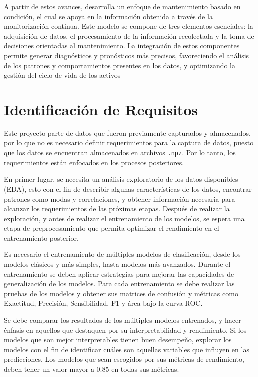 \documentclass[11pt,a4paper,spanish]{book}
\numberwithin{equation}{chapter}
\numberwithin{figure}{chapter}
\begin{document}
A partir de estos avances, \cite{jardine2006review} desarrolla un enfoque de 
mantenimiento basado en condición, el cual se apoya en la información obtenida a 
través de la monitorización continua. Este modelo se compone de tres elementos 
esenciales: la adquisición de datos, el procesamiento de la información recolectada y 
la toma de decisiones orientadas al mantenimiento. La integración de estos componentes 
permite generar diagnósticos y pronósticos más precisos, favoreciendo el análisis de 
los patrones y comportamientos presentes en los datos, y optimizando la gestión del 
ciclo de vida de los activos \cite{jardine2006review}


\chapter{Identificación de Requisitos}


Este proyecto parte de datos que fueron previamente capturados y almacenados, por lo 
que no es necesario definir requerimientos para la captura de datos, puesto que los 
datos se encuentran almacenados en archivos \texttt{.npz}. 
Por lo tanto, los requerimientos están enfocados en los procesos posteriores. 


En primer lugar,  se necesita un análisis exploratorio de los datos disponibles (EDA), 
esto con el fin de describir algunas características de los datos, encontrar patrones 
como modas y correlaciones, y obtener información necesaria para alcanzar los 
requerimientos de las próximas etapas.  Después de realizar la exploración, y antes de 
realizar el entrenamiento de los modelos, se espera una etapa de preprocesamiento que 
permita optimizar el rendimiento en el entrenamiento posterior.


Es necesario el entrenamiento de múltiples modelos de clasificación, desde los modelos 
clásicos y más simples, hasta modelos más avanzados. Durante el entrenamiento se deben 
aplicar estrategias para mejorar las capacidades de generalización de los modelos. 
Para cada entrenamiento se debe realizar las pruebas de los modelos y obtener sus 
matrices de confusión y métricas como  Exactitud, Precisión, Sensibilidad, F1 y 
área bajo la curva ROC.


Se debe comparar los resultados de los múltiples modelos entrenados, y hacer énfasis en 
aquellos que destaquen por su interpretabilidad y rendimiento. Si los modelos que son 
mejor interpretables tienen buen desempeño, explorar los modelos con el fin de 
identificar cuáles son aquellas variables que influyen en las predicciones. 
Los modelos que sean escogidos por sus métricas de rendimiento, deben tener un valor 
mayor a 0.85 en todas sus métricas. 
\end{document}
